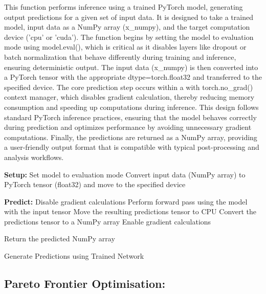\documentclass{article}
\begin{document}
This function performs inference using a trained PyTorch model, generating output predictions for a given set of input data. It is designed to take a trained model, input data as a NumPy array (x_numpy), and the target computation device ('cpu' or 'cuda'). The function begins by setting the model to evaluation mode using model.eval(), which is critical as it disables layers like dropout or batch normalization that behave differently during training and inference, ensuring deterministic output. The input data (x_numpy) is then converted into a PyTorch tensor with the appropriate dtype=torch.float32 and transferred to the specified device. The core prediction step occurs within a with torch.no_grad() context manager, which disables gradient calculation, thereby reducing memory consumption and speeding up computations during inference. This design follows standard PyTorch inference practices, ensuring that the model behaves correctly during prediction and optimizes performance by avoiding unnecessary gradient computations. Finally, the predictions are returned as a NumPy array, providing a user-friendly output format that is compatible with typical post-processing and analysis workflows.\\

\begin{algorithm}[H]
\SetAlgoLined %

\textbf{Setup:}\;
Set model to evaluation mode\;
Convert input data (NumPy array) to PyTorch tensor (float32) and move to the specified device\;

\textbf{Predict:}\;
Disable gradient calculations\;
Perform forward pass using the model with the input tensor\;
Move the resulting predictions tensor to CPU\;
Convert the predictions tensor to a NumPy array\;
Enable gradient calculations\; %

Return the predicted NumPy array\;

\caption{Generate Predictions using Trained Network}
\label{alg:predict} %
\end{algorithm}






\subsection{Pareto Frontier Optimisation: }
\end{document}
